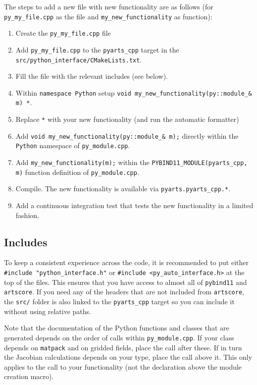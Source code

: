 The steps to add a new file with new functionality are as follows (for \verb|py_my_file.cpp| as the file and \texttt{my_new_functionality} as function):
\begin{enumerate}
\item Create the \verb|py_my_file.cpp| file
\item Add \verb|py_my_file.cpp| to the \texttt{pyarts_cpp} target in the \verb|src/python_interface/CMakeLists.txt|.
\item Fill the file with the relevant includes (see below).
\item Within \texttt{namespace Python} setup \texttt{void my_new_functionality(py::module_& m) {*}}.
\item Replace \texttt{*} with your new functionality (and run the automatic formatter)
\item Add \texttt{void my_new_functionality(py::module_& m);} directly within the \texttt{Python} namespace of  \verb|py_module.cpp|.
\item Add \texttt{my_new_functionality(m);} within the \texttt{PYBIND11_MODULE(pyarts_cpp, m)} function definition of  \verb|py_module.cpp|.
\item Compile.  The new functionality is available via \texttt{pyarts.pyarts_cpp.*}.
\item Add a continuous integration test that tests the new functionality in a limited fashion.
\end{enumerate}

\subsection{Includes}
To keep a consistent experience across the code, it is recommended to put either \texttt{#include "python_interface.h"} or \texttt{#include <py_auto_interface.h>}
at the top of the files.  This ensures that you have access to almost all of \texttt{pybind11} and \texttt{artscore}.  If you need any of the headers that are
not included from \texttt{artscore}, the \verb|src/| folder is also linked to the \texttt{pyarts_cpp} target so you can include it without using relative paths.

Note that the documentation of the Python functions and classes that are generated depends on the order of calls within \verb|py_module.cpp|.  If your
class depends on  \texttt{matpack} and on gridded fields, place the call after these.  If in turn the Jacobian calculations depends on your type,
place the call above it.  This only applies to the call to your functionality (not the declaration above the module creation macro).

